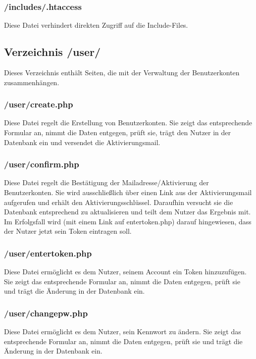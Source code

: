 \documentclass[parskip=half]{scrartcl}
\begin{document}
\subsubsection{/includes/.htaccess}
Diese Datei verhindert direkten Zugriff auf die Include-Files.



\subsection{Verzeichnis /user/}
Dieses Verzeichnis enthält Seiten, die mit der Verwaltung der Benutzerkonten zusammenhängen.

\subsubsection{/user/create.php}
Diese Datei regelt die Erstellung von Benutzerkonten.
Sie zeigt das entsprechende Formular an, nimmt die Daten entgegen, prüft sie, trägt den Nutzer in der Datenbank ein und versendet die Aktivierungsmail.

\subsubsection{/user/confirm.php}
Diese Datei regelt die Bestätigung der Mailadresse/Aktivierung der Benutzerkonten.
Sie wird ausschließlich über einen Link aus der Aktivierungsmail aufgerufen und erhält den Aktivierungsschlüssel.
Daraufhin versucht sie die Datenbank entsprechend zu aktualisieren und teilt dem Nutzer das Ergebnis mit.
Im Erfolgsfall wird (mit einem Link auf entertoken.php) darauf hingewiesen, dass der Nutzer jetzt sein Token eintragen soll.

\subsubsection{/user/entertoken.php}
Diese Datei ermöglicht es dem Nutzer, seinem Account ein Token hinzuzufügen.
Sie zeigt das entsprechende Formular an, nimmt die Daten entgegen, prüft sie und trägt die Änderung in der Datenbank ein.

\subsubsection{/user/changepw.php}
Diese Datei ermöglicht es dem Nutzer, sein Kennwort zu ändern.
Sie zeigt das entsprechende Formular an, nimmt die Daten entgegen, prüft sie und trägt die Änderung in der Datenbank ein.
\end{document}
